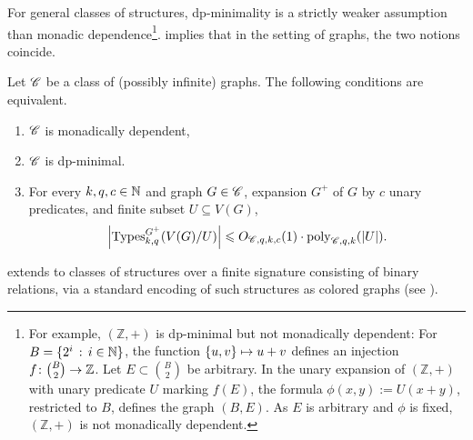     For general classes of structures, dp-minimality is a strictly weaker assumption than monadic dependence\footnote{For example, $(\mathbb Z,+)$ is dp-minimal \cite[paragraph before Proposition 6.6]{ADHMS2016} but not monadically dependent:
    For $B=\{2^i \,:\, i\in\mathbb N \}$, the function $\{u,v\}\mapsto u+v$ defines an injection $f\colon {B\choose 2} \to \mathbb Z$.
    Let $E\subset {B\choose 2}$ be arbitrary.
    In the unary expansion of $(\mathbb Z,+)$ with unary predicate $U$ marking $f(E)$,
    the formula $\phi(x,y):=U(x+y)$, restricted to $B$, defines the graph $(B,E)$. As $E$ is arbitrary and $\phi$ is fixed, $(\mathbb Z,+)$ is not monadically dependent.
    }.  implies that in the setting of graphs, the two notions coincide.
{\typeboundgeneraltrue    
\begin{corollary}\label{cor:dp-equivalence}
    Let $\mathscr C$ be a class of \iftypeboundgeneral(possibly infinite) graphs.
    The following conditions are equivalent.
    \begin{enumerate}
        \item\label{it:mon-dep} $\mathscr C$ is monadically dependent,
        \item\label{it:dp-min} $\mathscr C$ is dp-minimal.
        \item\label{it:type-bound} 
For every $k,q,c\in\mathbb N$ and \fi graph $G \in \mathscr C$, expansion $G^+$ of $G$ by $c$ unary predicates, and \iftypeboundgeneral finite \fi subset $U \subseteq V(G)$,
\[
    \left|\operatorname{Types}^{G^+}_{k,q}(V(G)/U)\right| \leqslant O_{\mathscr C,q,k,c}(1)\cdot \mathrm{poly}_{\mathscr C,q,k}(|U|).
\]
    \end{enumerate}
\end{corollary}
}
 extends to classes of structures over a finite signature consisting of binary relations, via a standard encoding of such structures as colored graphs (see \cite[full version, Section 19]{flip-breakability}).

